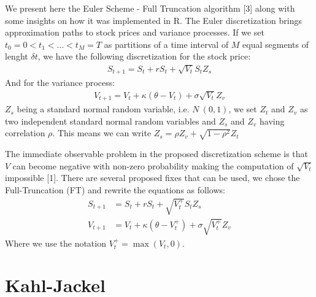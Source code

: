 \documentclass[12pt,twoside]{reedthesis}
\theoremstyle{definition}
\theoremstyle{definition}
\theoremstyle{remark}
\begin{document}
  We present here the Euler Scheme - Full Truncation algorithm {[}3{]}
  along with some insights on how it was implemented in R. The Euler
  discretization brings approximation paths to stock prices and variance
  processes. If we set \(t_0 = 0 < t_1 < \dots < t_M = T\) as partitions
  of a time interval of \(M\) equal segments of lenght \(\delta t\), we
  have the following discretization for the stock price:
  \begin{align}
  S_{t+1} = S_t + rS_t + \sqrt{V_t} S_t Z_s
  \end{align}
  \noindent
  And for the variance process:
  \begin{align}
  V_{t+1} = V_t + \kappa (\theta - V_t) + \sigma \sqrt{V_t} Z_v
  \end{align}
  \noindent
  \(Z_s\) being a standard normal random variable, i.e. \(N~(0,1)\), we
  set \(Z_t\) and \(Z_v\) as two independent standard normal random
  variables and \(Z_s\) and \(Z_v\) having correlation \(\rho\). This
  means we can write \(Z_s = \rho Z_v + \sqrt{1-\rho^2} Z_t\)
  
  The immediate observable problem in the proposed discretization scheme
  is that \(V\) can become negative with non-zero probability making the
  computation of \(\sqrt{V_t}\) impossible {[}1{]}. There are several
  proposed fixes that can be used, we chose the Full-Truncation (FT) and
  rewrite the equations as follows:
  \begin{align}
  S_{t+1} &= S_t + rS_t + \sqrt{V_{t}^{+}} S_t Z_s \\
  V_{t+1} &= V_t + \kappa (\theta - V_{t}^{+}) + \sigma \sqrt{V_{t}^{+}} Z_v
  \end{align}
  \noindent
  Where we use the notation \(V_{t}^{+} = \max(V_{t}, 0)\).
  
  \section{Kahl-Jackel}\label{kahl-jackel}
  
\end{document}
